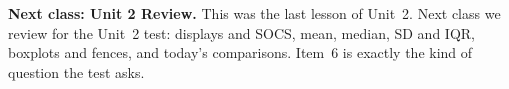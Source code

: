 \documentclass[12pt]{article}
\begin{document}
\boxguard[5]   %
\begin{spiralbox}
\textbf{Next class: Unit 2 Review.} This was the last lesson of Unit~2. Next class we review
for the Unit~2 test: displays and SOCS, mean, median, SD and IQR, boxplots and fences, and
today's comparisons. Item~6 is exactly the kind of question the test asks.
\end{spiralbox}
\end{document}
